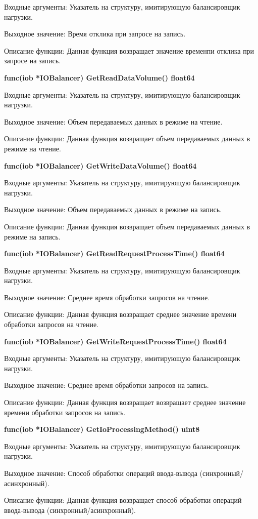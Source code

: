 Входные аргументы: Указатель на структуру, имитирующую балансировщик нагрузки.

Выходное значение: Время отклика при запросе на запись.

Описание функции: Данная функция возвращает значение временпи отклика при запросе на запись.

\textbf{func(iob *IOBalancer) GetReadDataVolume() float64}

Входные аргументы: Указатель на структуру, имитирующую балансировщик нагрузки.

Выходное значение: Объем передаваемых данных в режиме на чтение.

Описание функции: Данная функция возвращает объем передаваемых данных в режиме на чтение.

\textbf{func(iob *IOBalancer) GetWriteDataVolume() float64}

Входные аргументы: Указатель на структуру, имитирующую балансировщик нагрузки.

Выходное значение: Объем передаваемых данных в режиме на запись. 

Описание функции: Данная функция возвращает объем передаваемых данных в режиме на запись.

\textbf{func(iob *IOBalancer) GetReadRequestProcessTime() float64}

Входные аргументы: Указатель на структуру, имитирующую балансировщик нагрузки.

Выходное значение: Среднее время обработки запросов на чтение.

Описание функции: Данная функция возвращает среднее значение времени обработки запросов на чтение.

\textbf{func(iob *IOBalancer) GetWriteRequestProcessTime() float64}

Входные аргументы: Указатель на структуру, имитирующую балансировщик нагрузки.

Выходное значение: Среднее время обработки запросов на запись.

Описание функции: Данная функция возвращает возвращает среднее значение времени обработки запросов на запись.

\textbf{func(iob *IOBalancer) GetIoProcessingMethod() uint8}

Входные аргументы: Указатель на структуру, имитирующую балансировщик нагрузки.

Выходное значение: Способ обработки операций ввода-вывода (синхронный/асинхронный).

Описание функции: Данная функция возвращает способ обработки операций ввода-вывода (синхронный/асинхронный).

